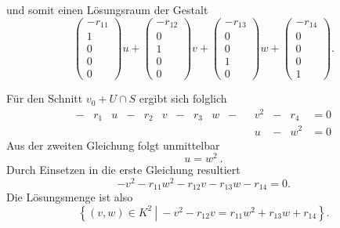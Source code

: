 \documentclass[a4paper,oneside, 11pt, openany%
]{article}
\theoremstyle{custom}
\theoremstyle{custom}
\begin{document}
und somit einen Lösungsraum der Gestalt
\begin{equation*}
	\begin{pmatrix}
		-r_{11}\\
		1\\
		0\\
		0\\
		0
	\end{pmatrix}u +
	\begin{pmatrix}
		-r_{12}\\
		0\\
		1\\
		0\\
		0
	\end{pmatrix}v +
	\begin{pmatrix}
		-r_{13}\\
		0\\
		0\\
		1\\
		0
	\end{pmatrix}w +
	\begin{pmatrix}
		-r_{14}\\
		0\\
		0\\
		0\\
		1
	\end{pmatrix}.
\end{equation*}

Für den Schnitt $v_0 + U \cap S $ ergibt sich folglich
\begin{equation*}
	\begin{alignedat}{14}
		-&r_{1}&u&-&r_{2}&v&-&r_{3}&w&-&&v^2&-&r_{4}&=0\\
		&&&&&&&&&&&u&-&w^2&= 0
	\end{alignedat}
\end{equation*}
Aus der zweiten Gleichung folgt unmittelbar
\begin{equation*}
	u = w^2\ .
\end{equation*}
Durch Einsetzen in die erste Gleichung resultiert
\begin{equation*}
	-v^2-r_{11} w^2   - r_{12} v - r_{13}w - r_{14} = 0.
\end{equation*}
Die Lösungsmenge ist also 
\begin{equation*}
	\left\lbrace (v,w) \in K^2 \ \left| \ -v^2- r_{12} v = r_{11} w^2 +r_{13}w + r_{14}\right.\right\rbrace.
\end{equation*}
\end{document}

